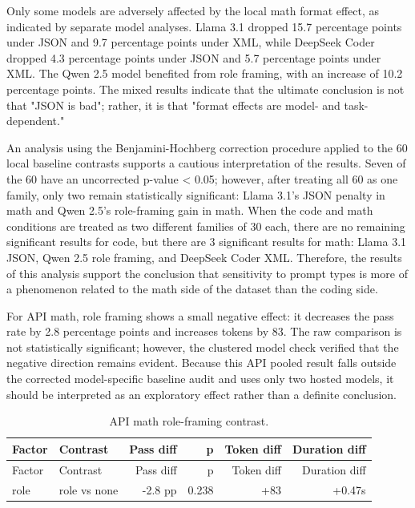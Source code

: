 \documentclass{llncs}
\begin{document}
Only some models are adversely affected by the local math format effect, as indicated by separate model analyses. Llama 3.1 dropped 15.7 percentage points under JSON and 9.7 percentage points under XML, while DeepSeek Coder dropped 4.3 percentage points under JSON and 5.7 percentage points under XML. The Qwen 2.5 model benefited from role framing, with an increase of 10.2 percentage points. The mixed results indicate that the ultimate conclusion is not that "JSON is bad"; rather, it is that "format effects are model- and task-dependent."

An analysis using the Benjamini-Hochberg correction procedure applied to the 60 local baseline contrasts supports a cautious interpretation of the results. Seven of the 60 have an uncorrected p-value \textless{} 0.05; however, after treating all 60 as one family, only two remain statistically significant: Llama 3.1's JSON penalty in math and Qwen 2.5's role-framing gain in math. When the code and math conditions are treated as two different families of 30 each, there are no remaining significant results for code, but there are 3 significant results for math: Llama 3.1 JSON, Qwen 2.5 role framing, and DeepSeek Coder XML. Therefore, the results of this analysis support the conclusion that sensitivity to prompt types is more of a phenomenon related to the math side of the dataset than the coding side.

For API math, role framing shows a small negative effect: it decreases the pass rate by 2.8 percentage points and increases tokens by 83. The raw comparison is not statistically significant; however, the clustered model check verified that the negative direction remains evident. Because this API pooled result falls outside the corrected model-specific baseline audit and uses only two hosted models, it should be interpreted as an exploratory effect rather than a definite conclusion.

\begin{longtable}[]{@{}llrrrr@{}}
\caption{API math role-framing contrast.}\tabularnewline
\toprule\noalign{}
Factor & Contrast & Pass diff & p & Token diff & Duration diff \\
\midrule\noalign{}
\endfirsthead
\toprule\noalign{}
Factor & Contrast & Pass diff & p & Token diff & Duration diff \\
\midrule\noalign{}
\endhead
\bottomrule\noalign{}
\endlastfoot
role & role vs none & -2.8 pp & 0.238 & +83 & +0.47s \\
\end{longtable}
\end{document}
